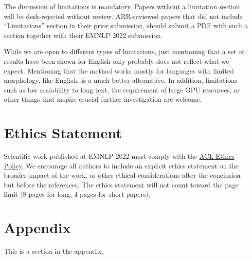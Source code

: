 \documentclass[11pt]{article}
\begin{document}
The discussion of limitations is mandatory. Papers without a limitation section will be desk-rejected without review.
ARR-reviewed papers that did not include ``Limitations'' section in their prior submission, should submit a PDF with such a section together with their EMNLP 2022 submission.

While we are open to different types of limitations, just mentioning that a set of results have been shown for English only probably does not reflect what we expect. 
Mentioning that the method works mostly for languages with limited morphology, like English, is a much better alternative.
In addition, limitations such as low scalability to long text, the requirement of large GPU resources, or other things that inspire crucial further investigation are welcome.

\section*{Ethics Statement}
Scientific work published at EMNLP 2022 must comply with the \href{https://www.aclweb.org/portal/content/acl-code-ethics}{ACL Ethics Policy}. We encourage all authors to include an explicit ethics statement on the broader impact of the work, or other ethical considerations after the conclusion but before the references. The ethics statement will not count toward the page limit (8 pages for long, 4 pages for short papers).




%


\appendix

\section{Appendix}
\label{sec:appendix}

This is a section in the appendix.
\end{document}
